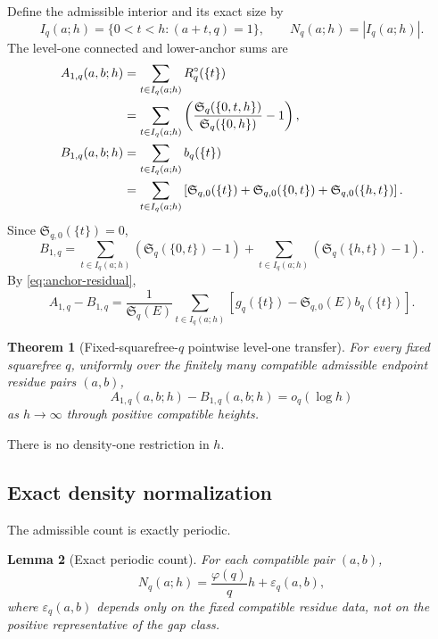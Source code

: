 \documentclass[11pt]{article}
\newtheorem{theorem}{Theorem}[section]
\newtheorem{lemma}[theorem]{Lemma}
\theoremstyle{definition}
\theoremstyle{remark}
\newcommand{\SSer}{\mathfrak S}
\newcommand{\1}{\mathbf 1}
\newcommand{\ph}{\varphi}
\newcommand{\eps}{\varepsilon}
\begin{document}
Define the admissible interior and its exact size by
\begin{equation}\label{eq:IqNq}
I_q(a;h)=\{0<t<h:(a+t,q)=1\},
\qquad N_q(a;h)=|I_q(a;h)|.
\end{equation}
The level-one connected and lower-anchor sums are
\begin{align}
A_{1,q}(a,b;h)
&=\sum_{t\in I_q(a;h)}R_q^\circ(\{t\})\notag\\
&=\sum_{t\in I_q(a;h)}
\left(
\frac{\SSer_q(\{0,t,h\})}{\SSer_q(\{0,h\})}-1
\right),\label{eq:A1q}\\
B_{1,q}(a,b;h)
&=\sum_{t\in I_q(a;h)}b_q(\{t\})\notag\\
&=\sum_{t\in I_q(a;h)}
\left[\SSer_{q,0}(\{t\})
+\SSer_{q,0}(\{0,t\})
+\SSer_{q,0}(\{h,t\})\right].\label{eq:B1q}
\end{align}
Since $\SSer_{q,0}(\{t\})=0$,
\begin{equation}\label{eq:B1q-simple}
B_{1,q}
=\sum_{t\in I_q(a;h)}(\SSer_q(\{0,t\})-1)
+\sum_{t\in I_q(a;h)}(\SSer_q(\{h,t\})-1).
\end{equation}
By \eqref{eq:anchor-residual},
\begin{equation}\label{eq:AminusB-connected}
A_{1,q}-B_{1,q}
=\frac1{\SSer_q(E)}
\sum_{t\in I_q(a;h)}
\left[g_q(\{t\})-\SSer_{q,0}(E)b_q(\{t\})\right].
\end{equation}

\begin{theorem}[Fixed-squarefree-$q$ pointwise level-one transfer]\label{thm:fixed-q}
For every fixed squarefree $q$, uniformly over the finitely many compatible admissible endpoint residue pairs $(a,b)$,
\begin{equation}\label{eq:main-theorem}
\boxed{A_{1,q}(a,b;h)-B_{1,q}(a,b;h)=o_q(\log h)}
\end{equation}
as $h\to\infty$ through positive compatible heights.
\end{theorem}

There is no density-one restriction in $h$.

\subsection{Exact density normalization}

The admissible count is exactly periodic.

\begin{lemma}[Exact periodic count]\label{lem:Nq}
For each compatible pair $(a,b)$,
\begin{equation}\label{eq:Nq-periodic}
\boxed{N_q(a;h)=\frac{\ph(q)}q h+\eps_q(a,b),}
\end{equation}
where $\eps_q(a,b)$ depends only on the fixed compatible residue data, not on the positive representative of the gap class.
\end{lemma}
\end{document}
